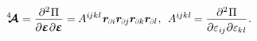 \nopagebreak\vspace{-0.1em}\begin{equation}
\stiffnesstensor \hspace{.1ex} =
\displaystyle\frac{\raisemath{-0.1em}{\partial^2 \hspace{.1ex} \potential}}{\raisemath{-0.1em}{\partial \infinitesimaldeformation \hspace{.1ex} \partial \infinitesimaldeformation}} = \hspace{-0.1ex}
A^{i\hspace{-0.1ex}jk\hspace{.06ex}l} \hspace{.16ex} \locationvector_\differentialindex{i} \locationvector_\differentialindex{\hspace{-0.1ex}j} \locationvector_\differentialindex{k} \locationvector_\differentialindex{l}
\hspace{.1ex} ,
\:\:
%
A^{i\hspace{-0.1ex}jk\hspace{.06ex}l} \hspace{-0.16ex} =
\displaystyle\frac{\raisemath{-0.1em}{\partial^2 \hspace{.1ex} \potential}}{\raisemath{-0.1em}{\partial \varepsilon_{i\hspace{-0.1ex}j} \hspace{.1ex} \partial \varepsilon_{\hspace{-0.1ex}k\hspace{.06ex}l}}}
\hspace{.16ex} .
\end{equation}

